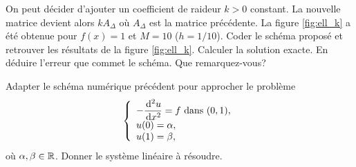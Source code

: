 \documentclass[12pt,a4paper,twoside]{article}
\begin{document}
\begin{exercise}
  On peut d\'ecider d'ajouter un coefficient de raideur $k>0$ constant.
  La nouvelle matrice devient alors $k A_{\Delta}$ o\`u $A_{\Delta}$ est la matrice 
  pr\'ec\'edente.
  La figure \ref{fig:ell_k} a \'et\'e obtenue pour $f(x) = 1$
  et $M=10$ ($h=1/10$).
  Coder le sch\'ema propos\'e et retrouver les r\'esultats
  de la figure \ref{fig:ell_k}.
  Calculer la solution exacte.
  En d\'eduire l'erreur que commet le sch\'ema.
  Que remarquez-vous?
\end{exercise}


\begin{exercise}
  Adapter le sch\'ema num\'erique pr\'ec\'edent pour approcher
  le probl\`eme
  \begin{align*}
    \left\{
    \begin{array}{l}
      - \dfrac{\!\;\mathrm{d}^2 u}{\!\;\mathrm{d} x^2} = f \text{ dans } (0,1) ,
      \\
      u(0) = \alpha ,
      \\
      u(1) = \beta ,
    \end{array}
    \right.
  \end{align*}
  o\`u $\alpha, \beta \in \mathbb{R}$.
  Donner le syst\`eme lin\'eaire \`a r\'esoudre.
\end{exercise}
\end{document}
